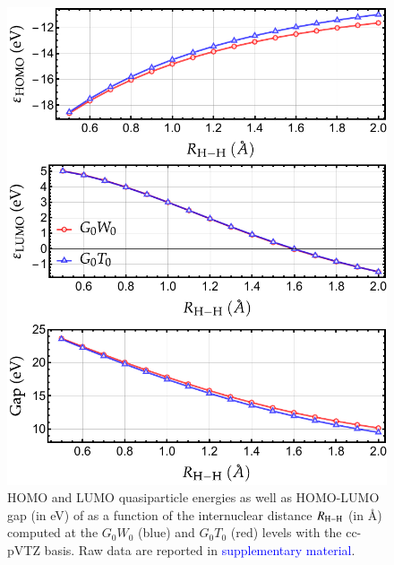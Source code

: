 \documentclass[aip,jcp,reprint,noshowkeys,superscriptaddress]{revtex4-1}
\newcommand{\SupMat}{\textcolor{blue}{supplementary material}}
\begin{document}
\begin{figure}[t]
	\includegraphics[width=\linewidth]{fig2}
	\caption{HOMO and LUMO quasiparticle energies as well as HOMO-LUMO gap (in \si{\eV}) of  as a function of the internuclear distance $R_{\ce{H-H}}$ (in \si{\angstrom}) computed at the $G_0W_0$ (blue) and $G_0T_0$ (red) levels with the cc-pVTZ basis.
	Raw data are reported in {\SupMat}.}
	\label{fig:H2_gap}
\end{figure}
\end{document}
